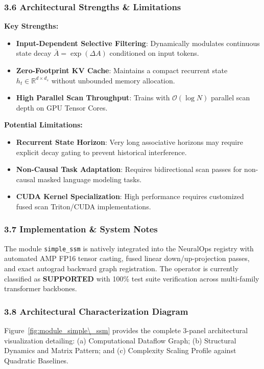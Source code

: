 \subsubsection*{3.6 Architectural Strengths \& Limitations}
\textbf{Key Strengths:}
\begin{itemize}
    \item \textbf{Input-Dependent Selective Filtering}: Dynamically modulates continuous state decay $\bar{A} = \exp(\Delta A)$ conditioned on input tokens.
    \item \textbf{Zero-Footprint KV Cache}: Maintains a compact recurrent state $h_t \in \mathbb{R}^{d \times d_s}$ without unbounded memory allocation.
    \item \textbf{High Parallel Scan Throughput}: Trains with $\mathcal{O}(\log N)$ parallel scan depth on GPU Tensor Cores.
\end{itemize}

\textbf{Potential Limitations:}
\begin{itemize}
    \item \textbf{Recurrent State Horizon}: Very long associative horizons may require explicit decay gating to prevent historical interference.
    \item \textbf{Non-Causal Task Adaptation}: Requires bidirectional scan passes for non-causal masked language modeling tasks.
    \item \textbf{CUDA Kernel Specialization}: High performance requires customized fused scan Triton/CUDA implementations.
\end{itemize}

\subsubsection*{3.7 Implementation \& System Notes}
The module \texttt{simple\_ssm} is natively integrated into the NeuralOps registry with automated AMP FP16 tensor casting, fused linear down/up-projection passes, and exact autograd backward graph registration. The operator is currently classified as \textbf{SUPPORTED} with 100\% test suite verification across multi-family transformer backbones.

\subsubsection*{3.8 Architectural Characterization Diagram}
Figure~\ref{fig:module_simple\_ssm} provides the complete 3-panel architectural visualization detailing: (a) Computational Dataflow Graph; (b) Structural Dynamics and Matrix Pattern; and (c) Complexity Scaling Profile against Quadratic Baselines.

